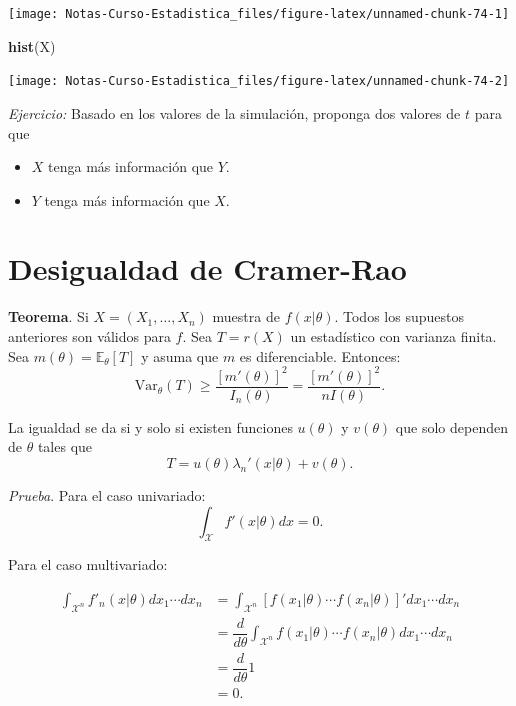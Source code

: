 \documentclass[
  12pt,
]{book}
\newenvironment{Shaded}{\begin{snugshade}}{\end{snugshade}}
\newcommand{\KeywordTok}[1]{\textcolor[rgb]{0.13,0.29,0.53}{\textbf{#1}}}
\newcommand{\NormalTok}[1]{#1}
\providecommand{\tightlist}{%
  \setlength{\itemsep}{0pt}\setlength{\parskip}{0pt}}
\begin{document}
\begin{center}\texttt{[image: Notas-Curso-Estadistica\_files/figure-latex/unnamed-chunk-74-1]} \end{center}

\begin{Shaded}
\begin{Highlighting}[]
\KeywordTok{hist}\NormalTok{(X)}
\end{Highlighting}
\end{Shaded}

\begin{center}\texttt{[image: Notas-Curso-Estadistica\_files/figure-latex/unnamed-chunk-74-2]} \end{center}

\emph{Ejercicio:} Basado en los valores de la simulación, proponga dos valores de \(t\) para que

\begin{itemize}
\tightlist
\item
  \(X\) tenga más información que \(Y\).
\item
  \(Y\) tenga más información que \(X\).
\end{itemize}

\hypertarget{desigualdad-de-cramer-rao}{%
\section{Desigualdad de Cramer-Rao}\label{desigualdad-de-cramer-rao}}

\textbf{Teorema}. Si \(X = (X_1,\dots, X_n)\) muestra de \(f(x|\theta)\). Todos los supuestos anteriores son válidos para \(f\). Sea \(T = r(X)\) un estadístico con varianza finita. Sea \(m(\theta) = \mathbb E_{\theta}[T]\) y asuma que \(m\) es diferenciable. Entonces:
\[\text{Var}_\theta(T)\geq \dfrac{[m'(\theta)]^2}{I_n(\theta)} =\dfrac{[m'(\theta)]^2}{nI(\theta)} .\]

La igualdad se da si y solo si existen funciones \(u(\theta)\) y \(v(\theta)\) que solo dependen de \(\theta\) tales que
\[T = u(\theta)\lambda_n'(x|\theta) + v(\theta).\]

\emph{Prueba}. Para el caso univariado:
\[\int_{\mathcal X}f'(x|\theta)dx = 0.\]

Para el caso multivariado:

\begin{align*}
\int_{\mathcal X^n}f'_n(x|\theta)dx_1\cdots dx_n & =\int_{\mathcal X^n}[f(x_1|\theta)\cdots f(x_n|\theta)]'dx_1\cdots dx_n \\
& = \dfrac d{d\theta} \int_{\mathcal X^n}f(x_1|\theta)\cdots f(x_n|\theta)dx_1\cdots dx_n \\
&= \dfrac d{d\theta} 1 \\
&= 0.
\end{align*}
\end{document}

